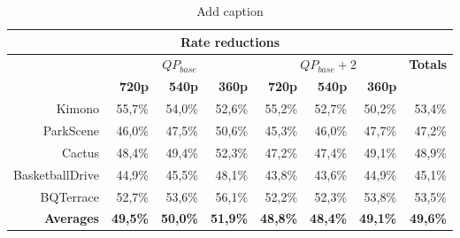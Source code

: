 \begin{table}[htbp]
  \centering
  \caption{Add caption}
    \begin{tabular}{r|rrr|rrr|r}
    \toprule
    \multicolumn{8}{c}{\textbf{Rate reductions}} \\
    \midrule
       & \multicolumn{3}{c|}{\textbf{$QP_{base}$}} & \multicolumn{3}{c|}{\textbf{$QP_{base}+2$}} & \multicolumn{1}{c}{\textbf{Totals}} \\
       & \textbf{720p} & \textbf{540p} & \textbf{360p} & \textbf{720p} & \textbf{540p} & \textbf{360p} &  \\
    Kimono & 55,7\% & 54,0\% & 52,6\% & 55,2\% & 52,7\% & 50,2\% & 53,4\% \\
    ParkScene & 46,0\% & 47,5\% & 50,6\% & 45,3\% & 46,0\% & 47,7\% & 47,2\% \\
    Cactus & 48,4\% & 49,4\% & 52,3\% & 47,2\% & 47,4\% & 49,1\% & 48,9\% \\
    BasketballDrive & 44,9\% & 45,5\% & 48,1\% & 43,8\% & 43,6\% & 44,9\% & 45,1\% \\
    BQTerrace & 52,7\% & 53,6\% & 56,1\% & 52,2\% & 52,3\% & 53,8\% & 53,5\% \\
    \textbf{Averages} & \textbf{49,5\%} & \textbf{50,0\%} & \textbf{51,9\%} & \textbf{48,8\%} & \textbf{48,4\%} & \textbf{49,1\%} & \textbf{49,6\%} \\
    \bottomrule
    \end{tabular}%
  \label{tab:addlabel}%
\end{table}%
